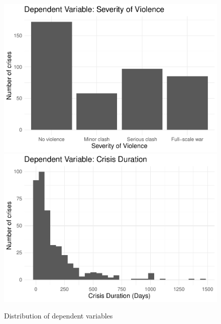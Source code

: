\documentclass[
]{article}
\begin{document}
\begin{figure}[h!]

{\centering \includegraphics[width=0.8\linewidth,]{2021-03-26_ICB-Domains_files/figure-latex/dv-1} \includegraphics[width=0.8\linewidth,]{2021-03-26_ICB-Domains_files/figure-latex/dv-2} 

}

\caption{Distribution of dependent variables}\label{fig:dv}
\end{figure}
\end{document}
